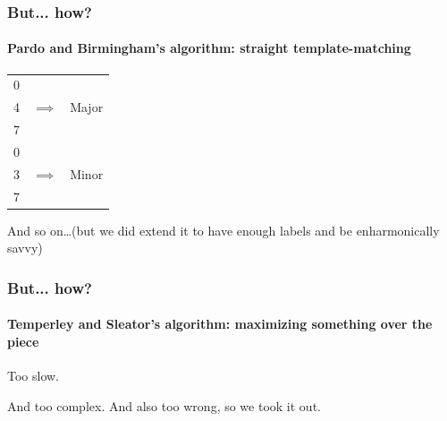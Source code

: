 \documentclass{beamer}
\begin{document}
\begin{frame}
  \frametitle{But... how?}
  \framesubtitle{Pardo and Birmingham's algorithm: straight
    template-matching}
  \begin{center}
    \begin{tabular}{rrr}
      0 &            &  \\
      4 & $\implies$ & Major \\
      7 &            &  \\ 
      \hline
      0 &            &  \\
      3 & $\implies$ & Minor \\
      7 &            &  \\
    \end{tabular}
  
    And so on\ldots (but we did extend it to have enough labels and
      be enharmonically savvy)
  \end{center}
\end{frame}

\begin{frame}
  \frametitle{But... how?}
  \framesubtitle{Temperley and Sleator's algorithm:
    maximizing something over the piece}
  \begin{center}
    \begin{huge}
      Too slow.
    \end{huge}
    
    \addvspace{5em}
    And too complex. And also too wrong, so we took it out.

  \end{center}
\end{frame}
\end{document}
